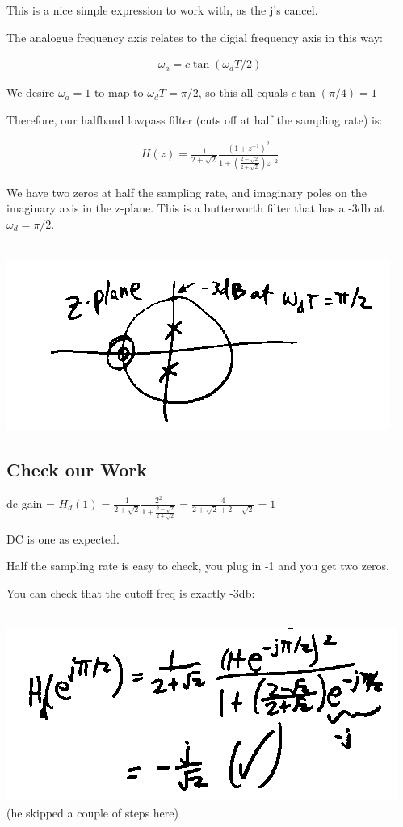 This is a nice simple expression to work with, as the j's cancel. 

The analogue frequency axis relates to the digial frequency axis in this way:

\begin{align*}
\omega_a = c \tan(\omega_d T / 2)
\end{align*}

We desire $\omega_a = 1$  to map to $\omega_dT = \pi / 2$, so this all equals
$c \tan(\pi/4) = 1$

Therefore, our halfband lowpass filter (cuts off at half the sampling rate) is:

\begin{align*}
H(z) = \frac{1}{2 + \sqrt{2}} \frac{(1+ z^{-1})^2} {1 + 
(\frac{2 - \sqrt{2}}{2 + \sqrt{2}})z^{-2}
}
\end{align*}

We have two zeros at half the sampling rate, and imaginary poles on the imaginary
axis in the z-plane. This is a butterworth filter that has a -3db at 
$\omega_d  = \pi/2$. 

\\
\includegraphics[scale=0.5]{frames/17m}\\

\subsection*{Check our Work}

dc gain = $H_d(1) = \frac{1}{2 + \sqrt{2}} 
\frac{2^2}{1 +
\frac{2 - \sqrt{2}}{2 + \sqrt{2}}
} =
\frac{4}{2 +\sqrt{2} + 2 - \sqrt{2} } = 1
$

DC is one as expected.

Half the sampling rate is easy to check, you plug in -1 and you get two zeros.

You can check that the cutoff freq is exactly -3db:

\\
\includegraphics[scale=0.5]{frames/17n}\\

(he skipped a couple of steps here)\\
